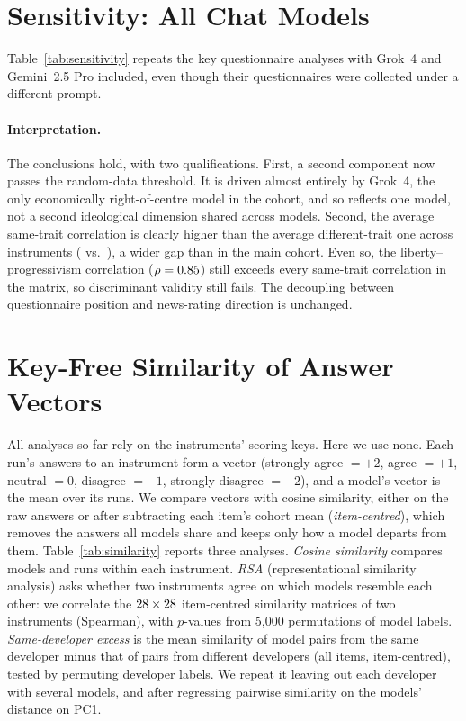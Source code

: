 \documentclass[11pt]{article}
\begin{document}
\section{Sensitivity: All \nNModelsAll{} Chat Models}
\label{app:sensitivity}

Table~\ref{tab:sensitivity} repeats the key questionnaire analyses with Grok~4 and Gemini~2.5 Pro included, even though their questionnaires were collected under a different prompt.









\paragraph{Interpretation.} The conclusions hold, with two qualifications. First, a second component now passes the random-data threshold. It is driven almost entirely by Grok~4, the only economically right-of-centre model in the cohort, and so reflects one model, not a second ideological dimension shared across models. Second, the average same-trait correlation is clearly higher than the average different-trait one across instruments (\nSMeanMono{} vs.\ \nSMeanHH), a wider gap than in the main cohort. Even so, the liberty--progressivism correlation ($\rho=0.85$) still exceeds every same-trait correlation in the matrix, so discriminant validity still fails. The decoupling between questionnaire position and news-rating direction is unchanged.


\section{Key-Free Similarity of Answer Vectors}
\label{app:similarity}

All analyses so far rely on the instruments' scoring keys. Here we use none. Each run's answers to an instrument form a vector (strongly agree $=+2$, agree $=+1$, neutral $=0$, disagree $=-1$, strongly disagree $=-2$), and a model's vector is the mean over its runs. We compare vectors with cosine similarity, either on the raw answers or after subtracting each item's cohort mean (\emph{item-centred}), which removes the answers all models share and keeps only how a model departs from them. Table~\ref{tab:similarity} reports three analyses. \emph{Cosine similarity} compares models and runs within each instrument. \emph{RSA} (representational similarity analysis) asks whether two instruments agree on which models resemble each other: we correlate the $28\times28$ item-centred similarity matrices of two instruments (Spearman), with $p$-values from 5{,}000 permutations of model labels. \emph{Same-developer excess} is the mean similarity of model pairs from the same developer minus that of pairs from different developers (all \nNItems{} items, item-centred), tested by permuting developer labels. We repeat it leaving out each developer with several models, and after regressing pairwise similarity on the models' distance on PC1.
\end{document}
